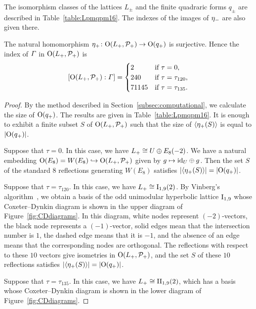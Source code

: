 \documentclass{amsart} %
\begin{document}
%
The isomorphism classes of the lattices $L_{\pm}$ and 
the finite quadraric forms $q_{\pm}$ are described in Table~\ref{table:Lpmqpm16}.
The indexes of the images of ${\eta}_{-}$ are also given there.
%
\begin{proposition}\label{prop:etaplussurj16}
The natural homomorphism ${\eta}_{+}\colon \mathord{\mathrm{O}}(L_{+}, \mathord{\mathcal{P}}_{+})\to \mathord{\mathrm{O}}(q_{+})$ is surjective.
Hence the index of $\varGamma$ in $\mathord{\mathrm{O}}(L_{+}, \mathord{\mathcal{P}}_{+})$ is
\[
[\mathord{\mathrm{O}}(L_{+}, \mathord{\mathcal{P}}_{+}): \varGamma]=
\begin{cases}
2 & \textrm{if $\tau=0$}, \\
240 & \textrm{if $\tau=\tau_{120}$}, \\
71145 & \textrm{if $\tau=\tau_{135}$}.
\end{cases}
\]
\end{proposition}
%
\begin{proof}
By the method described in Section~\ref{subsec:computational},
we calculate the size of $\mathord{\mathrm{O}}(q_{+})$.
The results are given in Table~\ref{table:Lpmqpm16}.
It is enough to exhibit a finite subset $S$ 
of $\mathord{\mathrm{O}}(L_{+}, \mathord{\mathcal{P}}_{+})$ such that 
the size of $\langle {{\eta}_{+}(S)} \rangle$ is equal to $|\mathord{\mathrm{O}}(q_{+})|$.
\par
Suppose that $\tau=0$.
In this case,
we have $L_{+}\cong U\oplus E_8(-2)$.
We have a natural embedding $\mathord{\mathrm{O}}(E_8)=W(E_8)\hookrightarrow \mathord{\mathrm{O}}(L_{+}, \mathord{\mathcal{P}}_{+})$
given by $g\mapsto \mathord{\mathrm{id}}_U \oplus g$.
Then %
the set $S$ of the standard $8$ reflections generating $W(E_8)$ 
satisfies $|\langle {{\eta}_{+}(S)} \rangle|=|\mathord{\mathrm{O}}(q_{+})|$.
%
\par
Suppose that $\tau=\tau_{120}$.
In this case,
we have $L_{+}\cong \mathrm{I}_{1, 9}(2)$.
By Vinberg’s algorithm~\cite{Vinberg1985}, 
we obtain a basis of the odd unimodular hyperbolic lattice $\mathrm{I}_{1,9}$ 
whose Coxeter–Dynkin diagram is shown in the upper diagram of Figure~\ref{fig:CDdiagrams}. 
In this diagram, 
white nodes represent $(-2)$-vectors, 
the black node represents a $(-1)$-vector,
solid edges mean that the intersection number is $1$, 
the dashed edge means that it is $-1$, 
and the absence of an edge means that the corresponding nodes are orthogonal.
The reflections 
with respect to these $10$ vectors
give isometries in $\mathord{\mathrm{O}}(L_{+}, \mathord{\mathcal{P}}_{+})$, and 
 the set $S$ of these $10$ reflections
satisfies $|\langle {{\eta}_{+}(S)} \rangle|=|\mathord{\mathrm{O}}(q_{+})|$.
%
\par
Suppose that $\tau=\tau_{135}$.
In this case,
we have $L_{+}\cong \mathrm{II}_{1, 9}(2)$,
which 
has a basis 
whose Coxeter–Dynkin diagram is shown in the lower diagram of Figure~\ref{fig:CDdiagrams}. 

\end{proof}
\end{document}
